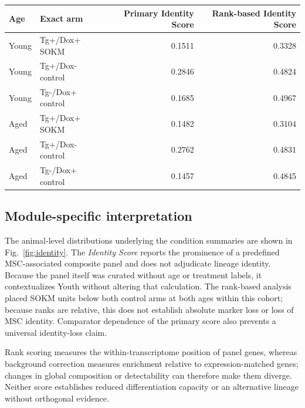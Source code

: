 \documentclass[10pt,twocolumn]{article}
\newcommand{\IdentityScore}{\textit{Identity Score}}
\newcommand{\SOKM}{SOKM}
\begin{document}
\begin{strip}
\noindent\begin{minipage}{\textwidth}
\centering
{}
\label{tab:identity}
\small
\begin{tabular}{llrr}
\toprule
Age & Exact arm & Primary Identity Score & Rank-based Identity Score \\
\midrule
Young & Tg+/Dox+ \SOKM & 0.1511 & 0.3328 \\
Young & Tg+/Dox- control & 0.2846 & 0.4824 \\
Young & Tg-/Dox+ control & 0.1685 & 0.4967 \\
Aged & Tg+/Dox+ \SOKM & 0.1482 & 0.3104 \\
Aged & Tg+/Dox- control & 0.2762 & 0.4831 \\
Aged & Tg-/Dox+ control & 0.1457 & 0.4845 \\
\bottomrule
\end{tabular}
\end{minipage}
\end{strip}


\subsection{Module-specific interpretation}

The animal-level distributions underlying the condition summaries are shown in Fig.~\ref{fig:identity}. The \IdentityScore{} reports the prominence of a predefined MSC-associated composite panel and does not adjudicate lineage identity. Because the panel itself was curated without age or treatment labels, it contextualizes Youth without altering that calculation. The rank-based analysis placed \SOKM{} units below both control arms at both ages within this cohort; because ranks are relative, this does not establish absolute marker loss or loss of MSC identity. Comparator dependence of the primary score also prevents a universal identity-loss claim.

Rank scoring measures the within-transcriptome position of panel genes, whereas background correction measures enrichment relative to expression-matched genes; changes in global composition or detectability can therefore make them diverge. Neither score establishes reduced differentiation capacity or an alternative lineage without orthogonal evidence.
\end{document}
